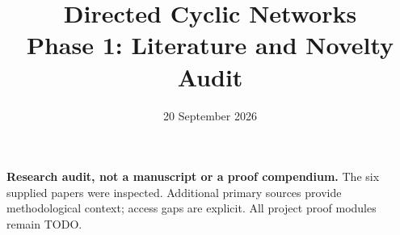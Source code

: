 \documentclass[11pt]{article}
\title{Directed Cyclic Networks\\Phase 1: Literature and Novelty Audit}
\author{}
\date{20 September 2026}
\begin{document}
\maketitle
\noindent\textbf{Research audit, not a manuscript or a proof compendium.}
The six supplied papers were inspected. Additional primary sources provide
methodological context; access gaps are explicit. All project proof modules remain TODO.
\tableofcontents
\clearpage

\clearpage

\clearpage


\end{document}
